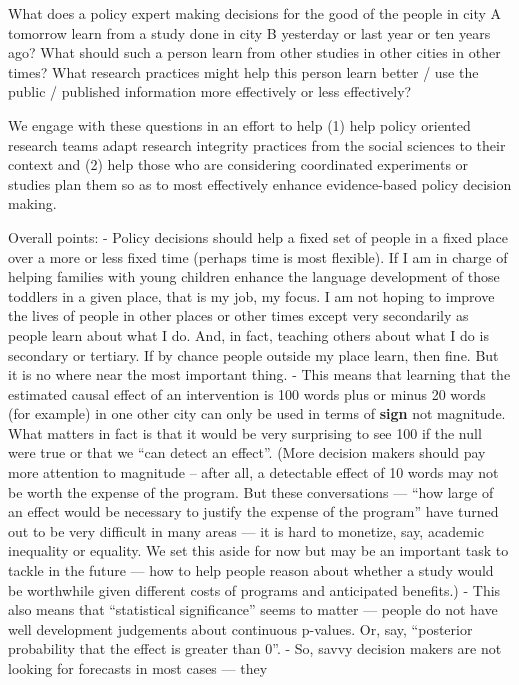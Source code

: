 \documentclass[
]{article}
\begin{document}
What does a policy expert making decisions for the good of the people in
city A tomorrow learn from a study done in city B yesterday or last year
or ten years ago? What should such a person learn from other studies in
other cities in other times? What research practices might help this
person learn better / use the public / published information more
effectively or less effectively?

We engage with these questions in an effort to help (1) help policy
oriented research teams adapt research integrity practices from the
social sciences to their context and (2) help those who are considering
coordinated experiments or studies plan them so as to most effectively
enhance evidence-based policy decision making.

Overall points: - Policy decisions should help a fixed set of people in
a fixed place over a more or less fixed time (perhaps time is most
flexible). If I am in charge of helping families with young children
enhance the language development of those toddlers in a given place,
that is my job, my focus. I am not hoping to improve the lives of people
in other places or other times except very secondarily as people learn
about what I do. And, in fact, teaching others about what I do is
secondary or tertiary. If by chance people outside my place learn, then
fine. But it is no where near the most important thing. - This means
that learning that the estimated causal effect of an intervention is 100
words plus or minus 20 words (for example) in one other city can only be
used in terms of \textbf{sign} not magnitude. What matters in fact is
that it would be very surprising to see 100 if the null were true or
that we ``can detect an effect''. (More decision makers should pay more
attention to magnitude -- after all, a detectable effect of 10 words may
not be worth the expense of the program. But these conversations ---
``how large of an effect would be necessary to justify the expense of
the program'' have turned out to be very difficult in many areas --- it
is hard to monetize, say, academic inequality or equality. We set this
aside for now but may be an important task to tackle in the future ---
how to help people reason about whether a study would be worthwhile
given different costs of programs and anticipated benefits.) - This also
means that ``statistical significance'' seems to matter --- people do
not have well development judgements about continuous p-values. Or, say,
``posterior probability that the effect is greater than 0''. - So, savvy
decision makers are not looking for forecasts in most cases --- they
\end{document}
